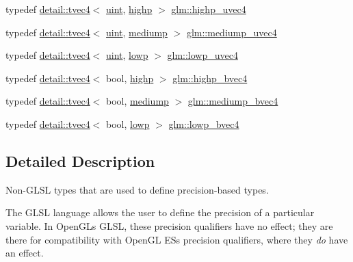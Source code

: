 \begin{DoxyCompactItemize}
typedef \hyperlink{structglm_1_1detail_1_1tvec4}{detail\+::tvec4}$<$ \hyperlink{group__core__precision_ga4fd29415871152bfb5abd588334147c8}{uint}, \hyperlink{namespaceglm_a0f04f086094c747d227af4425893f545ac6f7eab42eacbb10d59a58e95e362074}{highp} $>$ \hyperlink{group__core__precision_ga7cb8cc501f7e680e1889b93eb80e6c46}{glm\+::highp\+\_\+uvec4}
\item 
typedef \hyperlink{structglm_1_1detail_1_1tvec4}{detail\+::tvec4}$<$ \hyperlink{group__core__precision_ga4fd29415871152bfb5abd588334147c8}{uint}, \hyperlink{namespaceglm_a0f04f086094c747d227af4425893f545a6416f3ea0c9025fb21ed50c4d6620482}{mediump} $>$ \hyperlink{group__core__precision_gad90c29c2643136a9bcb1165eac47c810}{glm\+::mediump\+\_\+uvec4}
\item 
typedef \hyperlink{structglm_1_1detail_1_1tvec4}{detail\+::tvec4}$<$ \hyperlink{group__core__precision_ga4fd29415871152bfb5abd588334147c8}{uint}, \hyperlink{namespaceglm_a0f04f086094c747d227af4425893f545ae161af3fc695e696ce3bf69f7332bc2d}{lowp} $>$ \hyperlink{group__core__precision_ga17b5f652e5c64b0034065420d844fca7}{glm\+::lowp\+\_\+uvec4}
\item 
typedef \hyperlink{structglm_1_1detail_1_1tvec4}{detail\+::tvec4}$<$ bool, \hyperlink{namespaceglm_a0f04f086094c747d227af4425893f545ac6f7eab42eacbb10d59a58e95e362074}{highp} $>$ \hyperlink{group__core__precision_ga381539af52c5e5c659700e12fb706eaf}{glm\+::highp\+\_\+bvec4}
\item 
typedef \hyperlink{structglm_1_1detail_1_1tvec4}{detail\+::tvec4}$<$ bool, \hyperlink{namespaceglm_a0f04f086094c747d227af4425893f545a6416f3ea0c9025fb21ed50c4d6620482}{mediump} $>$ \hyperlink{group__core__precision_ga8bb7cfe902e2cb356450d211ca4d58e2}{glm\+::mediump\+\_\+bvec4}
\item 
typedef \hyperlink{structglm_1_1detail_1_1tvec4}{detail\+::tvec4}$<$ bool, \hyperlink{namespaceglm_a0f04f086094c747d227af4425893f545ae161af3fc695e696ce3bf69f7332bc2d}{lowp} $>$ \hyperlink{group__core__precision_ga24c651dc8cb20779b3773428aef4f7f4}{glm\+::lowp\+\_\+bvec4}
\end{DoxyCompactItemize}


\subsection{Detailed Description}
Non-\/\+G\+L\+SL types that are used to define precision-\/based types. 

The G\+L\+SL language allows the user to define the precision of a particular variable. In Open\+GL\textquotesingle{}s G\+L\+SL, these precision qualifiers have no effect; they are there for compatibility with Open\+GL ES\textquotesingle{}s precision qualifiers, where they {\itshape do} have an effect.

